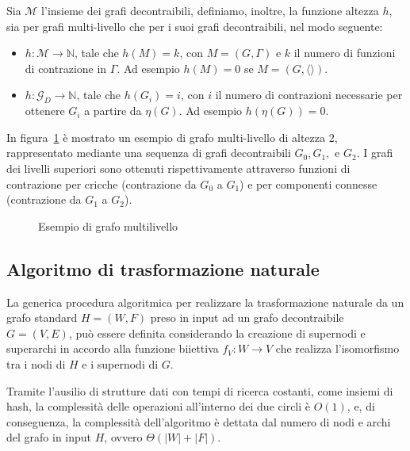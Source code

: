     Sia $\mathcal{M}$ l'insieme dei grafi decontraibili, definiamo, inoltre, la funzione altezza $h$, sia
    per grafi multi-livello che per i suoi grafi decontraibili, nel modo seguente:

    \begin{itemize}
        \item $h : \mathcal{M} \rightarrow \mathbb{N}$, tale che $h(M) = k$, con $M = (G, \Gamma)$ e $k$ il numero di
        funzioni di contrazione in $\Gamma$. Ad esempio $h(M) = 0$ se $M = (G, \langle \rangle)$.
        \item $h : \mathcal{G}_D \rightarrow \mathbb{N}$, tale che $h(G_i) = i$, con $i$ il numero di contrazioni
        necessarie per ottenere $G_i$ a partire da $\eta(G)$. Ad esempio $h(\eta(G)) = 0$.
    \end{itemize}

    In figura~\ref{fig:multi-level-graph-example} \`e mostrato un esempio di grafo multi-livello di altezza 2,
    rappresentato mediante una sequenza di grafi decontraibili $G_0, G_1,$ e $G_2$. I grafi dei livelli superiori
    sono ottenuti rispettivamente attraverso funzioni di contrazione per cricche (contrazione da $G_0$ a $G_1$) e
    per componenti connesse (contrazione da $G_1$ a $G_2$).

    \begin{figure}
        
        \caption{Esempio di grafo multilivello}
        \label{fig:multi-level-graph-example}
    \end{figure}

    \newpage

    \subsection{Algoritmo di trasformazione naturale}\label{subsec:algoritmo-di-trasformazione-naturale}

    La generica procedura algoritmica per realizzare la trasformazione naturale da un grafo standard $H = (W, F)$
    preso in input ad un grafo decontraibile $G = (V, E)$, pu\`o essere definita considerando la creazione di supernodi
    e superarchi in accordo alla funzione biiettiva
    $f_V: W \rightarrow V$ che realizza l'isomorfismo tra i nodi di $H$ e i supernodi di $G$.

    

    Tramite l'ausilio di strutture dati con tempi di ricerca costanti, come insiemi di hash, la complessit\`a delle
    operazioni all'interno dei due circli \`e $O(1)$,
    e, di conseguenza, la complessit\`a dell'algoritmo \`e dettata dal numero di nodi e archi del grafo in input $H$,
    ovvero $\Theta(|W| + |F|)$.





